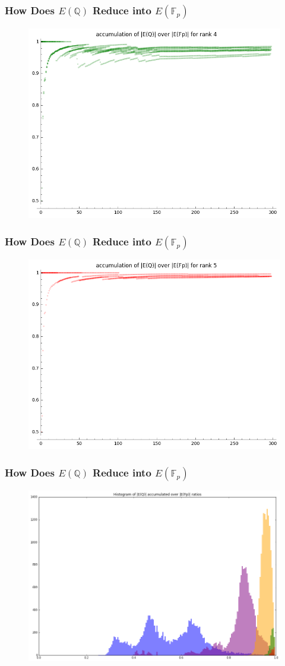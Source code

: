 \documentclass{beamer}
\newcommand{\Q}{\mathbb{Q}}
\newcommand{\F}{\mathbb{F}}
\begin{document}
\begin{frame}
\frametitle{How Does $E(\Q)$ Reduce into $E(\F_p)$}
\begin{figure}[H]
\centering
\includegraphics[width=.8\textwidth]{accumulation_index_4}
\end{figure}
\end{frame}

\begin{frame}
\frametitle{How Does $E(\Q)$ Reduce into $E(\F_p)$}
\begin{figure}[H]
\centering
\includegraphics[width=.8\textwidth]{accumulation_index_5}
\end{figure}
\end{frame}

\begin{frame}
\frametitle{How Does $E(\Q)$ Reduce into $E(\F_p)$}
\begin{figure}[H]
\centering
\includegraphics[width=.8\textwidth]{accumulation_hist_huge}
\end{figure}
\end{frame}
\end{document}

